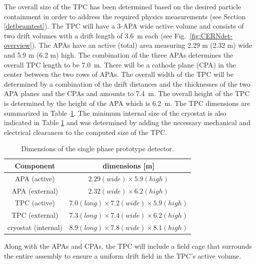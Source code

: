 The overall size of the TPC has been determined based on the desired particle containment in order to address the required physics measurements (see Section \ref{detbeamtest}). The TPC will have a 3-APA wide active volume and consists of two drift volumes with a drift length of 3.6~m each (see Fig.~\ref{fig:CERNdet-overview}).  
The APAs have an active (total) area measuring 2.29 m (2.32 m) wide and 5.9 m (6.2 m) high. The combination of the three APAs determines the overall TPC length to be 7.0~m. There will be a cathode plane (CPA) in the center between the two rows of APAs.  
The overall width of the TPC will be determined by a combination of the drift distances and the thicknesses of the two APA planes and the 
CPAs and amounts to 7.4~m.  
The overall height of the TPC is determined by the height of the APA which is 6.2~m.  The TPC dimensions are summarized in 
Table~\ref{table:TPC-dim}.
%
The minimum internal size of the cryostat is also indicated in Table \ref{table:TPC-dim} and was determined by adding the necessary mechanical and electrical clearances to the computed size of the TPC.  
 
\begin{table}[h]
\centering
\begin{tabular}{|c|c|}
\hline
\textbf{ Component } & dimensions [m]  \\ \hline \hline
APA  (active) &  $2.29 (wide) \times 5.9 (high)$ \\ \hline
APA  (external) &  $2.32 (wide) \times 6.2 (high)$ \\ \hline
TPC (active)       & $7.0 (long) \times 7.2 (wide) \times 5.9 (high)$  \\ \hline
TPC (external)       & $7.3 (long) \times 7.4 (wide) \times 6.2 (high)$  \\ \hline
cryostat (internal) &  $8.9 (long) \times 7.8 (wide) \times 8.1 (high)$  \\ \hline
\end{tabular}
\caption{Dimensions of the single phase prototype detector.}
\label{table:TPC-dim}
\end{table}
 
Along with the APAs and CPAs, the TPC will include a field cage that surrounds the entire assembly to ensure a uniform drift field in the TPC's active volume. 


